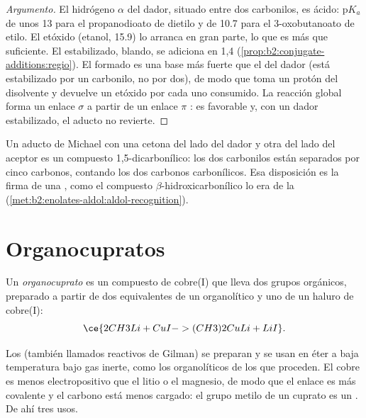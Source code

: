 \begin{proof}[Argumento]
El hidrógeno $\alpha$ del dador, situado entre dos carbonilos, es ácido: $\mathrm pK_a$ de unos 13 para el
propanodioato de dietilo y de 10.7 para el 3-oxobutanoato de etilo. El etóxido (etanol, 15.9) lo arranca en gran parte, lo que
es más que suficiente. El  estabilizado, blando, se adiciona en 1,4
(\cref{prop:b2:conjugate-additions:regio}). El  formado es una base más fuerte que el 
del dador (está estabilizado por un carbonilo, no por dos), de modo que toma un protón del disolvente y
devuelve un etóxido por cada uno consumido. La reacción global forma un enlace $\sigma$  a partir de un
enlace $\pi$ : es favorable y, con un dador estabilizado, el aducto no revierte.
\end{proof}

Un aducto de Michael con una cetona del lado del dador y otra del lado del aceptor es un compuesto
1,5-dicarbonílico: los dos carbonilos están separados por cinco carbonos, contando los dos carbonos carbonílicos. Esa disposición es la
firma de una , como el compuesto $\beta$-hidroxicarbonílico lo era de la 
(\cref{met:b2:enolates-aldol:aldol-recognition}).

\section{Organocupratos}

\begin{definition}[Organocupratos]\label{def:b2:conjugate-additions:cuprate}
Un \emph{organocuprato}  es un compuesto de cobre(I) que lleva dos grupos
orgánicos, preparado a partir de dos equivalentes de un organolítico y uno de un haluro de cobre(I):
\begin{equation*}
\ce{2 CH3Li + CuI -> (CH3)2CuLi + LiI}.
\end{equation*}
\end{definition}

Los  (también llamados reactivos de Gilman) se preparan y se usan en éter a baja temperatura bajo
gas inerte, como los organolíticos de los que proceden. El cobre es menos electropositivo que el litio o el
magnesio, de modo que el enlace  es más covalente y el carbono está menos cargado: el grupo metilo de un
cuprato es un . De ahí tres usos.

